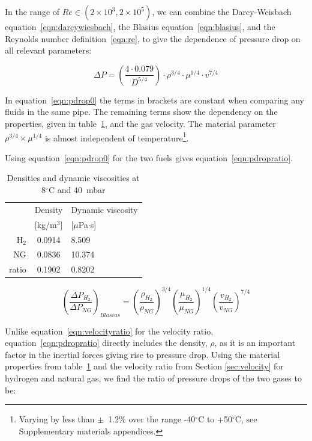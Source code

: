 \documentclass[5p]{elsarticle} %
\begin{document}
In the range of $Re \in (2\times10^3,2\times10^5)$, we can combine the Darcy-Weisbach equation~\eqref{eqn:darcywiesbach}, the Blasius equation~\eqref{eqn:blasius}, and the Reynolds number definition~\eqref{eqn:re}, to give the dependence of pressure drop on all relevant parameters:

\begin{equation}
\label{eqn:pdrop0}
\Delta P = \left ( \frac{4 \cdot 0.079}{D^{5/4}}\right ) \cdot \rho^{3/4} \cdot \mu^{1/4} \cdot v^{7/4}
\end{equation}

In equation~\eqref{eqn:pdrop0} the terms in brackets are constant when comparing any fluids in the same pipe. 
The remaining terms show the dependency on the properties, given in table~\ref{tab:dyn}, and the gas velocity.
The  material parameter $\rho^{3/4} \times \mu^{1/4}$ is almost independent of 
temperature\footnote{
Varying by less than $\pm$~1.2\% over the range -40$^\circ$C to +50$^\circ$C, see 
Supplementary materials appendices.
}.

Using equation~\eqref{eqn:pdrop0} for the two fuels gives equation~\eqref{eqn:pdropratio}.

\begin{table}
\centering
\begin{tabular}{r|c|l}
& Density & Dynamic viscosity \\
& [kg/m$^3$] & [$\mu$Pa$\cdot$s] \\
\hline
H$_2$ & 0.0914 & 8.509 \\
NG & 0.0836 & 10.374 \\
\hline
ratio & 0.1902 & 0.8202
\end{tabular}
\caption{\label{tab:dyn}Densities and dynamic viscosities at 8$^\circ$C and 40~mbar }
\end{table}

\begin{equation}
\label{eqn:pdropratio}
    \left(\frac{\Delta P_{H_2}}{\Delta P_{NG}}\right)_{Blasius} = 
    \left(\frac{\rho_{H_2}}{\rho_{NG}}\right)^{3/4} 
    \left(\frac{\mu_{H_2}}{\mu_{NG}}\right)^{1/4} 
    \left(\frac{v_{H_2}}{v_{NG}}\right)^{7/4}
\end{equation}

Unlike equation~\eqref{eqn:velocityratio} for the velocity ratio, equation~\eqref{eqn:pdropratio} directly includes the density, $\rho$, as it is an important factor in the inertial forces giving rise to pressure drop.
Using the material properties from table~\ref{tab:dyn} and the velocity ratio from Section \ref{sec:velocity} for hydrogen and natural gas, we find the ratio of pressure drops of the two gases to be:
\end{document}
